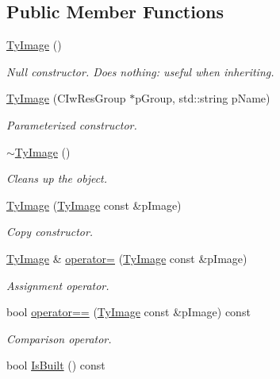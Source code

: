 \subsection*{Public Member Functions}
\begin{DoxyCompactItemize}
\item 
\hyperlink{class_ty_image_a8eba2fbf74bcad66d4ac918bbcaff3d3}{TyImage} ()
\begin{DoxyCompactList}\small\item\em Null constructor. Does nothing: useful when inheriting. \end{DoxyCompactList}\item 
\hyperlink{class_ty_image_ac6bb645510cb5990fb546a13e67b3b78}{TyImage} (CIwResGroup $\ast$pGroup, std::string pName)
\begin{DoxyCompactList}\small\item\em Parameterized constructor. \end{DoxyCompactList}\item 
\hyperlink{class_ty_image_a8d0afe12b66c11ddb057d031cdcc0e06}{$\sim$TyImage} ()
\begin{DoxyCompactList}\small\item\em Cleans up the object. \end{DoxyCompactList}\item 
\hyperlink{class_ty_image_aa925b26d19f52e846001a6133e8a15bb}{TyImage} (\hyperlink{class_ty_image}{TyImage} const \&pImage)
\begin{DoxyCompactList}\small\item\em Copy constructor. \end{DoxyCompactList}\item 
\hyperlink{class_ty_image}{TyImage} \& \hyperlink{class_ty_image_af2210a3cc8ef239e4b4f2668771d1360}{operator=} (\hyperlink{class_ty_image}{TyImage} const \&pImage)
\begin{DoxyCompactList}\small\item\em Assignment operator. \end{DoxyCompactList}\item 
bool \hyperlink{class_ty_image_a2837205d02eca3789ca60ef2fabb13e0}{operator==} (\hyperlink{class_ty_image}{TyImage} const \&pImage) const 
\begin{DoxyCompactList}\small\item\em Comparison operator. \end{DoxyCompactList}\item 
bool \hyperlink{class_ty_image_a4f1a45987b5cc4be8960a6a6b4091515}{IsBuilt} () const 

\end{DoxyCompactItemize}
